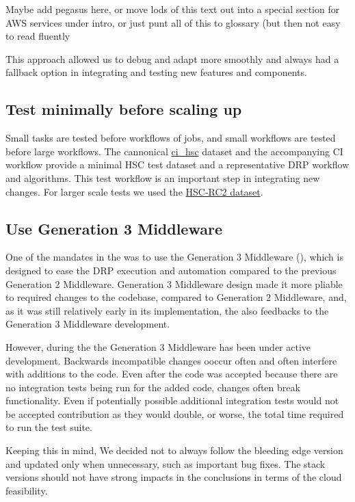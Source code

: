 {\color{red} Maybe add pegasus here, or move lods of this text out into a special section for AWS services under intro, or just punt all of this to glossary (but then not easy to read fluently}

This approach allowed us to debug and adapt more smoothly and always had a fallback option in integrating and testing new features and components.

\subsection{Test minimally before scaling up}

Small tasks are tested before workflows of jobs, and small workflows are tested before large workflows.
The cannonical \href{https://github.com/lsst/ci\_hsc}{ci\_hsc} dataset and the accompanying CI workflow provide a minimal HSC test dataset and a representative DRP workflow and algorithms.
This test workflow is an important step in integrating new changes.
For larger scale tests we used the \href{https://jira.lsstcorp.org/browse/DM-11345}{HSC-RC2 dataset}. 

\subsection{Use Generation 3 Middleware}

One of the mandates in the \poc was to use the Generation 3 Middleware (), which is designed to ease the DRP execution and automation compared to the previous Generation 2 Middleware. Generation 3 Middleware design made it more pliable to required changes to the codebase, compared to Generation 2 Middleware, and, as it was still relatively early in its implementation, the \poc also feedbacks to the Generation 3 Middleware development.

However, during the \poc the Generation 3 Middleware has been under active development. Backwards incompatible changes ooccur often and often interfere with additions to the code. Even after the code was accepted because there are no integration tests being run for the added code, changes often break functionality. Even if potentially possible additional integration tests would not be accepted contribution as they would double, or worse, the total time required to run the test suite.

Keeping this in mind, We decided not to always follow the bleeding edge version and updated only when unnecessary, such as important bug fixes. The stack versions should not have strong impacts in the \poc conclusions in terms of the cloud feasibility.

